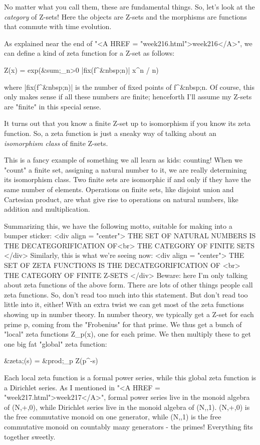 No matter what you call them, these are fundamental things.  So, let's 
look at the \emph{category} of Z-sets!  Here the objects are Z-sets and the 
morphisms are functions that commute with time evolution.  

As explained near the end of "<A HREF =
"week216.html">week216</A>", we can define a kind of zeta
function for a Z-set as follows:

Z(x) = exp(&sum;_{n>0} |fix(f^{&nbsp;n})| x^{n} / n)

where |fix(f^{&nbsp;n})| is the number of fixed points of 
f^{&nbsp;n}.  Of course, this
only makes sense if all these numbers are finite; henceforth I'll assume 
my Z-sets are "finite" in this special sense.  

It turns out that you know a finite Z-set up to isomorphism if you know its 
zeta function.  So, a zeta function is just a sneaky way of talking about 
an \emph{isomorphism class} of finite Z-sets.  


This is a fancy example of something we all learn as kids: counting!
When we "count" a finite set, assigning a natural number to
it, we are really determining its isomorphism class.  Two finite sets
are isomorphic if and only if they have the same number of elements.
Operations on finite sets, like disjoint union and Cartesian product,
are what give rise to operations on natural numbers, like addition and
multiplication.

Summarizing this, we have the following motto, suitable for making into
a bumper sticker:
<div align = "center">
  THE SET OF NATURAL NUMBERS IS THE DECATEGORIFICATION OF<br>
                THE CATEGORY OF FINITE SETS
</div>
Similarly, this is what we're seeing now:
<div align = "center">
  THE SET OF ZETA FUNCTIONS IS THE DECATEGORIFICATION OF  <br>
               THE CATEGORY OF FINITE Z-SETS
</div>
Beware: here I'm only talking about zeta functions of the above form.  There 
are lots of other things people call zeta functions.   So, don't read too 
much into this statement.  But don't read too little into it, either!   With 
an extra twist we can get most of the zeta functions showing up in number 
theory.  In number theory, we typically get a Z-set for each prime p, 
coming from the "Frobenius" for that prime.  We thus get a bunch of "local" 
zeta functions Z_{p}(x), one for each prime.  We then multiply these to get 
one big fat "global" zeta function:

&zeta;(s) = &prod;_{p} Z(p^{-s})

Each local zeta function is a formal power series, while this global
zeta function is a Dirichlet series.  As I mentioned in "<A HREF
= "week217.html">week217</A>", formal power series live in the
monoid algebra of (N,+,0), while Dirichlet series live in the monoid
algebra of (N,\times ,1).  (N,+,0) is the free commutative monoid on one
generator, while (N,\times ,1) is the free commutative monoid on countably
many generators - the primes!  Everything fits together sweetly.

